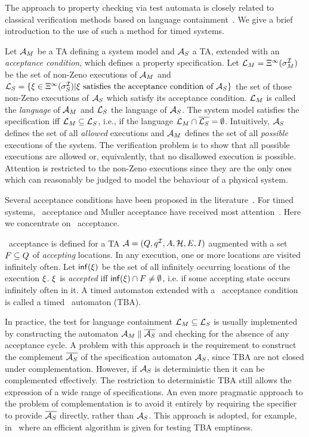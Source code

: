 {The approach to property checking via test automata is closely related
to classical verification methods based on language
containment~\cite{ad:94,kur:94,tho:90}. We give a brief
introduction to the use of such a method for timed systems. 

Let $\AA_M$ be a TA defining a system model and $\AA_S$ a TA, extended
with an \emph{acceptance condition}, which defines a property
specification. Let $\Lmodel = \Execdiv(\Init_M)$ be the set of
non-Zeno executions of $\AA_M$ and $\Lspec = \{\exec \in
\Execdiv(\Init_S) | \exec \text{ satisfies the acceptance condition of } 
\AA_S\}$ the set of those non-Zeno executions of $\AA_S$ which satisfy 
its acceptance condition. $\Lmodel$ is called the \emph{language} of
$\AA_M$ and $\Lspec$ the language of $\AA_S$. The system model
satisfies the specification iff $\Lmodel \subseteq \Lspec$, i.e., if
the language $\Lmodel \cap \compl{\Lspec} = \emptyset$. Intuitively,
$\AA_S$ defines the set of all \emph{allowed} executions and $\AA_M$
defines the set of all \emph{possible} executions of the system. The
verification problem is to show that all possible executions are
allowed or, equivalently, that no disallowed execution is
possible. Attention is restricted to the non-Zeno executions since
they are the only ones which can reasonably be judged to model the
behaviour of a physical system.

Several acceptance conditions have been proposed in the
literature~\cite{tho:90}. For timed systems, \Buchi\ acceptance
and Muller acceptance have received most attention~\cite{ad:94}.
Here we concentrate on \Buchi\ acceptance.

\Buchi\ acceptance is defined for a TA $\AA = (\tglocs, \tgiloc, \Actions, 
\tgclks, \tgedges, \tginv)$ augmented with a set $F \subseteq 
Q$ of \emph{accepting} locations. In any execution, one or more locations
are visited infinitely often. Let $\mathop{{\sf inf}}(\xi)$ be the set of all
infinitely occurring locations of the execution $\xi$. $\xi$
is \emph{accepted} iff $\mathop{{\sf inf}}(\xi) \cap F \neq \emptyset$, i.e.
if some accepting state occurs infinitely often in it. A timed automaton
extended with a \Buchi\ acceptance condition is called a timed \Buchi\
automaton (TBA). 

In practice, the test for language containment $\Lmodel\subseteq
\Lspec$ is usually implemented by constructing the automaton $\AA_M
\parallel \compl{\AA_S}$ and checking for the absence of any
acceptance cycle.  A problem with this approach is the requirement to
construct the complement $\compl{\AA_S}$ of the specification
automaton $\AA_S$, since TBA are not closed under
complementation. However, if $\AA_S$ is deterministic then it can be
complemented effectively. The restriction to deterministic TBA still
allows the expression of a wide range of specifications.  An even more
pragmatic approach to the problem of complementation is to avoid it
entirely by requiring the specifier to provide $\compl{\AA_S}$
directly, rather than $\AA_S$. This approach is adopted, for example,
in~\cite{tri:98} where an efficient algorithm is given for
testing TBA emptiness.

}
